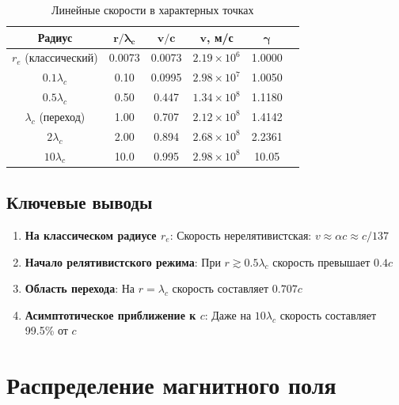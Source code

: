 \documentclass[12pt,a4paper]{article}
\begin{document}
\begin{table}[h]
\centering
\caption{Линейные скорости в характерных точках}
\label{tab:velocities}
\begin{tabular}{cccccc}
\toprule
\textbf{Радиус} & $\boldsymbol{r/\lambda_c}$ & $\boldsymbol{v/c}$ & $\boldsymbol{v}$, м/с & $\boldsymbol{\gamma}$ \\
\midrule
$r_e$ (классический) & 0.0073 & 0.0073 & $2.19 \times 10^6$ & 1.0000 \\
$0.1\lambda_c$ & 0.10 & 0.0995 & $2.98 \times 10^7$ & 1.0050 \\
$0.5\lambda_c$ & 0.50 & 0.447 & $1.34 \times 10^8$ & 1.1180 \\
$\lambda_c$ (переход) & 1.00 & 0.707 & $2.12 \times 10^8$ & 1.4142 \\
$2\lambda_c$ & 2.00 & 0.894 & $2.68 \times 10^8$ & 2.2361 \\
$10\lambda_c$ & 10.0 & 0.995 & $2.98 \times 10^8$ & 10.05 \\
\bottomrule
\end{tabular}
\end{table}

\subsection{Ключевые выводы}

\begin{enumerate}
    \item \textbf{На классическом радиусе $r_e$}: Скорость нерелятивистская: $v \approx \alpha c \approx c/137$

    \item \textbf{Начало релятивистского режима}: При $r \gtrsim 0.5\lambda_c$ скорость превышает $0.4c$

    \item \textbf{Область перехода}: На $r = \lambda_c$ скорость составляет $0.707c$

    \item \textbf{Асимптотическое приближение к $c$}: Даже на $10\lambda_c$ скорость составляет 99.5\% от $c$
\end{enumerate}

\section{Распределение магнитного поля}
\end{document}
